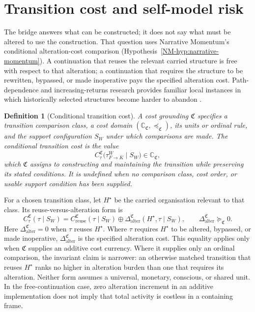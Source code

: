 \documentclass[11pt,a4paper]{article}
\newtheorem{definition}{Definition}[section]
\theoremstyle{remark}
\begin{document}
\section{Transition cost and self-model risk}\label{sec:cost-risk}
The bridge answers what can be constructed; it does not say what must be altered
to use the construction. That question uses Narrative Momentum's conditional alteration-cost comparison (Hypothesis~\ref{NM-hyp:narrative-momentum}).
A continuation that reuses the relevant carried structure is free with respect to
that alteration; a continuation that requires the structure to be rewritten,
bypassed, or made inoperative pays the specified alteration cost. Path-dependence
and increasing-returns research provides familiar local instances in which
historically selected structures become harder to abandon \citep{arthur1989,david1985,pierson2000}.

\begin{definition}[Conditional transition cost]
A \emph{cost grounding} $\mathfrak C$ specifies a transition comparison class,
a cost domain $(\mathbb C_{\mathfrak C},\preceq_{\mathfrak C})$, its units or
ordinal rule, and the support configuration $S_W$ under which comparisons are
made. The \emph{conditional transition cost} is the value
\[
 C^{\mathfrak C}_\tau\bigl(\tau^W_{F\to K}\mid S_W\bigr)
 \in\mathbb C_{\mathfrak C},
\]
which $\mathfrak C$ assigns to constructing and maintaining the transition while
preserving its stated conditions. It is undefined when no comparison class, cost
order, or usable support condition has been supplied.
\end{definition}

For a chosen transition class, let $H^\star$ be the carried organisation relevant
to that class. Its reuse-versus-alteration form is
\[
 C^{\mathfrak C}_\tau(\tau\mid S_W)=
 C^{\mathfrak C}_{\mathrm{reuse}}(\tau\mid S_W)
 \oplus \Delta^{\mathfrak C}_{\mathrm{alter}}(H^\star,\tau\mid S_W),
 \qquad \Delta^{\mathfrak C}_{\mathrm{alter}}\succeq_{\mathfrak C}0.
\]
Here $\Delta^{\mathfrak C}_{\mathrm{alter}}=0$ when $\tau$ reuses $H^\star$.
Where $\tau$ requires $H^\star$ to be altered, bypassed, or made inoperative,
$\Delta^{\mathfrak C}_{\mathrm{alter}}$ is the specified alteration cost. This
equality applies only when $\mathfrak C$ supplies an additive cost currency.
Where it supplies only an ordinal comparison, the invariant claim is narrower:
an otherwise matched transition that reuses $H^\star$ ranks no higher in
alteration burden than one that requires its alteration. Neither form assumes a
universal, monetary, conscious, or shared unit. In the free-continuation case,
zero alteration increment in an additive implementation does not imply that
total activity is costless in a containing frame.
\end{document}
